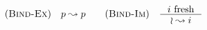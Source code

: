 \[\begin{array}{c}
    \RULE{Bind-Ex} \quad p \leadsto p \qquad
    \RULE{Bind-Im} \quad \inference{
        i\ \text{fresh}
    }{
        \IMP \leadsto i
    }
\end{array}\]
